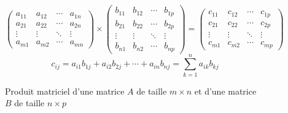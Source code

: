 \begin{figure}[H]
    \[
    \begin{pmatrix}
          a_{11} & a_{12} & \cdots & a_{1n}\\
          a_{21} & a_{22} & \cdots & a_{2n}\\
          \vdots & \vdots & \ddots & \vdots\\
          a_{m1} & a_{m2} & \cdots & a_{mn}
    \end{pmatrix}
    \times
    \begin{pmatrix}
        b_{11} & b_{12} & \cdots & b_{1p}\\
        b_{21} & b_{22} & \cdots & b_{2p}\\
        \vdots & \vdots & \ddots & \vdots\\
        b_{n1} & b_{n2} & \cdots & b_{np}
    \end{pmatrix}
    =
    \begin{pmatrix}
        c_{11} & c_{12} & \cdots & c_{1p}\\
        c_{21} & c_{22} & \cdots & c_{2p}\\
        \vdots & \vdots & \ddots & \vdots\\
        c_{m1} & c_{m2} & \cdots & c_{mp}
    \end{pmatrix}
    \]
    \[
        c_{ij}= a_{i1} b_{1j} + a_{i2} b_{2j} +\cdots+ a_{in} b_{nj} = \sum_{k=1}^n a_{ik}b_{kj}
    \]
    \captionsetup{labelformat=empty}
    \caption{Produit matriciel d'une matrice $A$ de taille $m \times n$ et d'une matrice $B$ de taille $n \times p$}
    \label{fig:matprod}
\end{figure}
\addtocounter{figure}{-1}